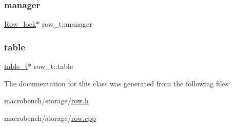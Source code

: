 \subsubsection{\texorpdfstring{manager}{manager}}
{\footnotesize\ttfamily \hyperlink{classRow__lock}{Row\+\_\+lock}$\ast$ row\+\_\+t\+::manager}

\mbox{\label{classrow__t_a22020591ba4e4965d7b2c58172c023f7}} 
\subsubsection{\texorpdfstring{table}{table}}
{\footnotesize\ttfamily \hyperlink{classtable__t}{table\+\_\+t}$\ast$ row\+\_\+t\+::table}



The documentation for this class was generated from the following files\+:\begin{DoxyCompactItemize}
\item 
macrobench/storage/\hyperlink{row_8h}{row.\+h}\item 
macrobench/storage/\hyperlink{row_8cpp}{row.\+cpp}\end{DoxyCompactItemize}
